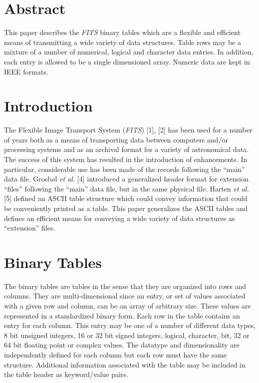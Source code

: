 \section{Abstract}

    This paper describes the {\em FITS\/} binary tables which are a
flexible and efficient means of transmitting a wide variety of data
structures.  Table rows may be a mixture of a number of numerical, 
logical and character data entries.  In addition, each entry is allowed
to be a single dimensioned array.  Numeric data are kept in 
IEEE formats.

\section{Introduction}

   The Flexible Image Transport System ({\em FITS\/}) [1], [2]
has been used for a number of years both
as a means of transporting data between computers and/or processing
systems and as an archival format for a variety of astronomical data.
The success of this system has resulted in the introduction of
enhancements.  In particular, considerable use has been made of the
records following the ``main'' data file.  Grosb\o l {\it et al.} [4] 
introduced a generalized header format for 
extension ``files''
following the ``main'' data file, but in the same physical file.
Harten {\it et al.} [5] defined an ASCII table 
structure which could convey information that could be 
conveniently printed as a table.
This paper generalizes the ASCII tables and defines an efficient means
for conveying a wide variety of data structures as
 ``extension'' files.

\section {Binary Tables}

   The binary tables are tables in the sense that they are
organized into rows and columns.  They are multi-dimensional since
an entry, or set of values associated with a given row and column, can
be an array of arbitrary size.  These values are represented in a
standardized binary form.  Each row in the table contains an entry for
each column.  This entry may be one of a number of different data
types, 8 bit unsigned integers, 16 or 32 bit signed integers, logical, 
character, bit, 32 or 
64 bit floating point or complex values.  The datatype and
dimensionality are independently defined for each column but each row
must have the same structure.  Additional information associated with
the table may be included in the table header as keyword/value
pairs.

